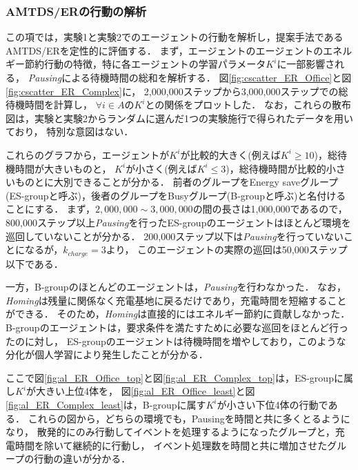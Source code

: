 \documentclass[12pt,a4j,twoside]{jarticle}
\def\AgentSet{A}
\begin{document}
  \subsubsection{AMTDS/ERの行動の解析}\label{sec:expAnalsis}
  この項では，実験1と実験2でのエージェントの行動を解析し，提案手法であるAMTDS/ERを定性的に評価する．
  まず，エージェントのエージェントのエネルギー節約行動の特徴，特に各エージェントの学習パラメータ$K^i$に一部影響される，
  {\em Pausing}による待機時間の総和を解析する．
  図\ref{fig:cscatter_ER_Office}と図\ref{fig:cscatter_ER_Complex}に，
  2,000,000ステップから3,000,000ステップでの総待機時間を計算し，
  $\forall i\in\AgentSet$の$K^i$との関係をプロットした．
  なお，これらの散布図は，実験と実験2からランダムに選んだ1つの実験施行で得られたデータを用いており，
  特別な意図はない．
  \par

  これらのグラフから，エージェントが$K^i$が比較的大きく(例えば$K^i\geq 10$)，総待機時間が大きいものと，
  $K^i$が小さく(例えば$K^i\leq 3$)，総待機時間が比較的小さいものとに大別できることが分かる．
  前者のグループをEnergy saveグループ(ES-groupと呼ぶ)，後者のグループをBusyグループ(B-groupと呼ぶ)と名付けることにする．
  まず，$2,000,000 \sim 3,000,000$の間の長さは1,000,000であるので，
  800,000ステップ以上{\em Pausing}を行ったES-groupのエージェントはほとんど環境を巡回していないことが分かる．
  200,000ステップ以下は{\em Pausing}を行っていないことになるが，$k_{charge} = 3$より，
  このエージェントの実際の巡回は50,000ステップ以下である．
  \par

  一方，B-groupのほとんどのエージェントは，{\em Pausing}を行わなかった．
  なお，{\em Homing}は残量に関係なく充電基地に戻るだけであり，充電時間を短縮することができる．
  そのため，{\em Homing}は直接的にはエネルギー節約に貢献しなかった．
  B-groupのエージェントは，要求条件を満たすために必要な巡回をほとんど行ったのに対し，
  ES-groupのエージェントは待機時間を増やしており，このような分化が個人学習により発生したことが分かる．
  \par

  ここで図\ref{fig:al_ER_Office_top}と図\ref{fig:al_ER_Complex_top}は，ES-groupに属し$K^i$が大きい上位4体を，
  図\ref{fig:al_ER_Office_least}と図\ref{fig:al_ER_Complex_least}は，B-groupに属す$K^i$が小さい下位4体の行動である．
  これらの図から，どちらの環境でも，Pausingを時間と共に多くとるようになり，
  散発的にのみ行動してイベントを処理するようになったグループと，充電時間を除いて継続的に行動し，
  イベント処理数を時間と共に増加させたグループの行動の違いが分かる．
  \par
\end{document}
